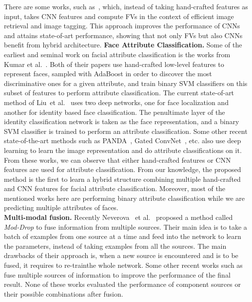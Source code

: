 \documentclass{sig-alternate-05-2015}
\begin{document}
There are some works, such as~\cite{uricchio2015fisher}, which, instead of taking hand-crafted features as input, takes CNN features and compute FVs in the context of efficient image retrieval and image tagging. This approach improves the performance of CNNs and attains state-of-art performance, showing that
not only FVs but also CNNs benefit from hybrid architecture.
\textbf{Face Attribute Classification.}
Some of the earliest and seminal work on facial attribute classification is the  works from Kumar et al.~\cite{kumar2008facetracer,kumar2009attribute}. 
Both of their papers use hand-crafted low-level features to represent faces, sampled with AdaBoost in order to discover the most discriminative ones for a given attribute, 
and train binary SVM classifiers on this subset of features to perform attribute classification. 
The current state-of-art method of Liu~et al.~\cite{liu2015deep} uses two deep networks, one for face localization and another for identity based 
face classification. The penultimate layer of the identity classification network is taken as the face representation,  and a binary  SVM classifier is trained to 
perform an attribute classification. Some other recent state-of-the-art methods such as PANDA~\cite{zhang2014panda}, Gated ConvNet~\cite{kang2015face}, etc.  also use deep learning
to learn the image representation and do attribute classifications on it. From these works, we can observe that either hand-crafted features  or CNN features are used for attribute
classification. From our knowledge, the proposed method is the first to learn a hybrid structure combining multiple hand-crafted and CNN 
features for facial attribute classification. Moreover, most of the mentioned works here are performing binary attribute classification while we are predicting multiple attributes of faces.
\vspace{0.8em} \\
\textbf{Multi-modal fusion.} Recently Neverova~ et al.~\cite{neverova2015oddrop} proposed a method called {\em Mod-Drop} to fuse information from multiple sources. Their main idea is to take a batch of examples from one source at a time and feed into the network to learn the parameters,  instead of taking examples from all the sources. The main drawbacks of their approach is, when a new source is encountered and is to be fused, it requires to re-trainthe whole network. Some other recent works such as ~\cite{kahou2013combining,srivastava2012multimodal,wu2014exploring,ngiam2011multimodal} fuse multiple sources of information to improve the performance of the final result. None of these works evaluated the performance of component sources or their possible combinations after fusion.
\end{document}
